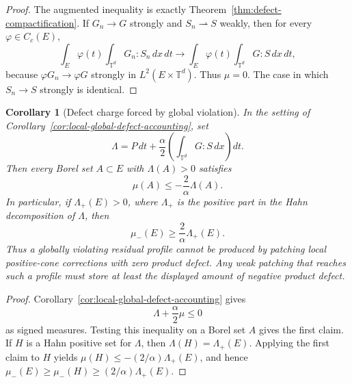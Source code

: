 \documentclass[11pt]{article}
\numberwithin{equation}{section}
\newtheorem{corollary}[theorem]{Corollary}
\newcommand{\T}{\mathbb T}
\begin{document}
\begin{proof}
The augmented inequality is exactly Theorem~\ref{thm:defect-compactification}.
If \(G_n\to G\) strongly and \(S_n\rightharpoonup S\) weakly, then for every
\(\varphi\in C_c(E)\),
\[
  \int_E\varphi(t)\int_{\T^d}G_n:S_n\,dx\,dt
  \to
  \int_E\varphi(t)\int_{\T^d}G:S\,dx\,dt ,
\]
because \(\varphi G_n\to\varphi G\) strongly in \(L^2(E\times\T^d)\).  Thus
\(\mu=0\).  The case in which \(S_n\to S\) strongly is identical.
\end{proof}

\begin{corollary}[Defect charge forced by global violation]
\label{cor:defect-charge-violation}
In the setting of Corollary~\ref{cor:local-global-defect-accounting}, set
\[
  \Lambda
  =
  P\,dt+\frac{\alpha}{2}
  \left(\int_{\T^d}G:S\,dx\right)dt .
\]
Then every Borel set \(A\subset E\) with \(\Lambda(A)>0\) satisfies
\[
  \mu(A)\le -\frac{2}{\alpha}\Lambda(A).
\]
In particular, if \(\Lambda_+(E)>0\), where \(\Lambda_+\) is the positive part
in the Hahn decomposition of \(\Lambda\), then
\[
  \mu_-(E)\ge \frac{2}{\alpha}\Lambda_+(E).
\]
Thus a globally violating residual profile cannot be produced by patching
local positive-cone corrections with zero product defect.  Any weak patching
that reaches such a profile must store at least the displayed amount of
negative product defect.
\end{corollary}

\begin{proof}
Corollary~\ref{cor:local-global-defect-accounting} gives
\[
  \Lambda+\frac{\alpha}{2}\mu\le0
\]
as signed measures.  Testing this inequality on a Borel set \(A\) gives the
first claim.  If \(H\) is a Hahn positive set for \(\Lambda\), then
\(\Lambda(H)=\Lambda_+(E)\).  Applying the first claim to \(H\) yields
\(\mu(H)\le -(2/\alpha)\Lambda_+(E)\), and hence
\(\mu_-(E)\ge \mu_-(H)\ge (2/\alpha)\Lambda_+(E)\).
\end{proof}
\end{document}

